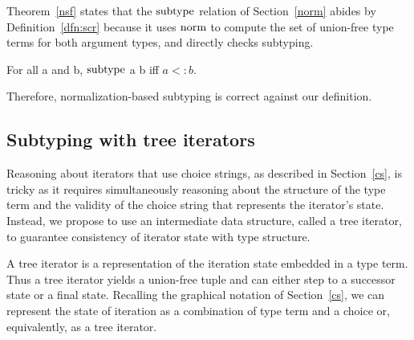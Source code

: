 \documentclass[a4paper,english]{lipics-v2019}
\renewcommand{\c}[1]{\ensuremath{\text{\lstinline{#1}}}\xspace}
\begin{document}
\noindent
Theorem~\ref{nsf} states that the \c{subtype} relation of
Section~\ref{norm} abides by Definition~\ref{dfn:scr} because it uses
\c{norm} to compute the set of union-free type terms for both argument
types, and directly checks subtyping.

\begin{theorem}[NF Subtyping]\label{nsf}
For all  a and b, \c{subtype} a b iff $a <: b$.
\end{theorem}

\noindent
Therefore, normalization-based subtyping is correct against our definition.


\subsection{Subtyping with tree iterators}

Reasoning about iterators that use choice strings, as described in
Section~\ref{cs}, is tricky as it requires simultaneously reasoning about
the structure of the type term and the validity of the choice string that
represents the iterator's state. Instead, we propose to use an intermediate
data structure, called a tree iterator, to guarantee consistency of iterator
state with type structure.

A tree iterator is a representation of the iteration state embedded in a type
term. Thus a tree iterator yields a union-free tuple and can either step to a
successor state or a final state. Recalling the graphical notation of
Section~\ref{cs}, we can represent the state of iteration as a combination of
type term and a choice or, equivalently, as a tree iterator.
\end{document}
